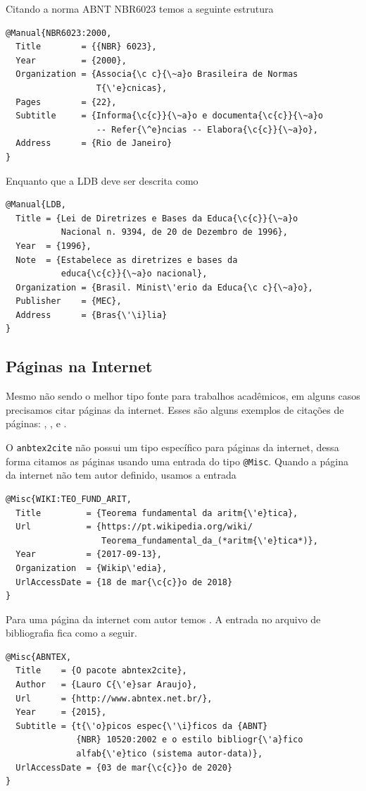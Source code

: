 \documentclass[fleqn]{profmat-cefet}
\begin{document}
Citando a norma ABNT NBR6023 \cite{NBR6023:2000} temos a seguinte estrutura
\begin{lstlisting}
@Manual{NBR6023:2000,
  Title        = {{NBR} 6023},
  Year         = {2000},
  Organization = {Associa{\c c}{\~a}o Brasileira de Normas 
                  T{\'e}cnicas},
  Pages        = {22},
  Subtitle     = {Informa{\c{c}}{\~a}o e documenta{\c{c}}{\~a}o
                  -- Refer{\^e}ncias -- Elabora{\c{c}}{\~a}o},
  Address      = {Rio de Janeiro}
}
\end{lstlisting}

Enquanto que a LDB \cite{LDB} deve ser descrita como
\begin{lstlisting}
@Manual{LDB,
  Title = {Lei de Diretrizes e Bases da Educa{\c{c}}{\~a}o 
           Nacional n. 9394, de 20 de Dezembro de 1996},
  Year  = {1996},
  Note  = {Estabelece as diretrizes e bases da 
           educa{\c{c}}{\~a}o nacional},
  Organization = {Brasil. Minist\'erio da Educa{\c c}{\~a}o},
  Publisher    = {MEC},
  Address      = {Bras{\'\i}lia}
}
\end{lstlisting}

\subsection{Páginas na Internet}

Mesmo não sendo o melhor tipo fonte para trabalhos acadêmicos, 
em alguns casos precisamos citar páginas da internet. 
Esses são alguns exemplos de citações de páginas:
\citeauthor{WIKI:TEO_FUND_ARIT},
\citeauthor{TEXSTUDIO},
\citeauthor{GEOGEBRA} e
\citeauthor{JABREF}.

O \texttt{anbtex2cite} não possui um tipo específico para páginas da internet,
dessa forma citamos as páginas usando uma entrada do tipo \lstinline|@Misc|.
Quando a página da internet não tem autor definido, usamos a entrada 
\begin{lstlisting}
@Misc{WIKI:TEO_FUND_ARIT,
  Title         = {Teorema fundamental da aritm{\'e}tica},
  Url           = {https://pt.wikipedia.org/wiki/
                   Teorema_fundamental_da_(*aritm{\'e}tica*)},
  Year          = {2017-09-13},
  Organization  = {Wikip\'edia},
  UrlAccessDate = {18 de mar{\c{c}}o de 2018}
}
\end{lstlisting}

Para uma página da internet com autor temos \cite{ABNTEX,ARAUJO:ABNTEX2CITE}. 
A entrada no arquivo de bibliografia fica como a seguir.
\begin{lstlisting}
@Misc{ABNTEX,
  Title    = {O pacote abntex2cite},
  Author   = {Lauro C{\'e}sar Araujo},
  Url      = {http://www.abntex.net.br/},
  Year     = {2015},
  Subtitle = {t{\'o}picos espec{\'\i}ficos da {ABNT} 
              {NBR} 10520:2002 e o estilo bibliogr{\'a}fico
              alfab{\'e}tico (sistema autor-data)},
  UrlAccessDate = {03 de mar{\c{c}}o de 2020}
}
\end{lstlisting}
\end{document}
